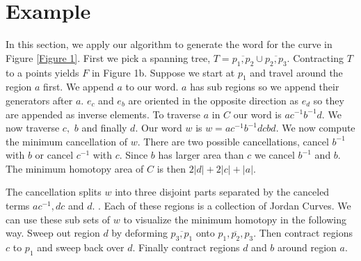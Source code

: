 \documentclass[11pt]{article}
\begin{document}
\section{Example}

In this section, we apply our algorithm to generate the  word for the curve in Figure \ref{Figure 1}. First we pick a spanning tree, $T=\overline{p_1,p_2}\cup\overline{p_2,p_3}.$ Contracting $T$ to a points yields $F$ in Figure 1b. Suppose we start at $p_1$ and travel around the region $a$ first. We append $a$ to our word. $a$ has sub regions so we append their generators after $a$. $e_c$ and $e_b$ are oriented in the opposite direction as $e_d$ so they are appended as inverse elements. To traverse $a$ in $C$ our word is $ac^{-1}b^{-1}d.$ We now traverse $c,$ $b$ and finally $d.$ Our word $w$ is $w=ac^{-1}b^{-1}dcbd$. We now compute the minimum cancellation of $w.$ There are two possible cancellations, cancel $b^{-1}$ with $b$ or cancel $c^{-1}$ with $c.$ Since $b$ has larger area than $c$ we cancel $b^{-1}$ and $b.$ The minimum homotopy area of $C$ is then $2|d|+2|c|+|a|.$

The cancellation splits $w$ into three disjoint parts separated by the canceled terms $ac^{-1}, dc$ and $d.$ . Each of these regions is a collection of Jordan Curves. We can use these sub sets of $w$ to visualize the minimum homotopy in the following way. Sweep out region $d$ by deforming $\overline{p_3,p_1}$ onto $\overline{p_1,p_2,p_3}.$ Then contract regions $c$ to $p_1$ and sweep back over $d.$ Finally contract regions $d$ and $b$ around region $a.$


 \newpage

 
\end{document}
